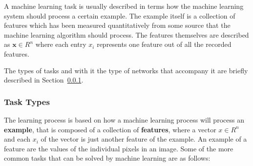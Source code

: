 \documentclass[12pt]{article}
\begin{document}
A machine learning task is usually described in terms how the machine learning system should process a certain example. The example itself is a collection of features which has been measured quantitatively from some source that the machine learning algorithm should process. The features themselves are described as $\textbf{x} \in R^n$ where each entry $x_i$ represents one feature out of all the recorded features.

The types of tasks and with it the type of networks that accompany it are briefly described in Section~\ref{subsub:task_types}. 

\subsubsection{Task Types}
\label{subsub:task_types}
The learning process is based on how a machine learning process will process an \textbf{example}, that is composed of a collection of \textbf{features}, where a vector $x \in R^n$ and each $x_i$ of the vector is just another feature of the example. An example of a feature are the values of the individual pixels in an image. Some of the more common tasks that can be solved by machine learning are as follows:
\end{document}
